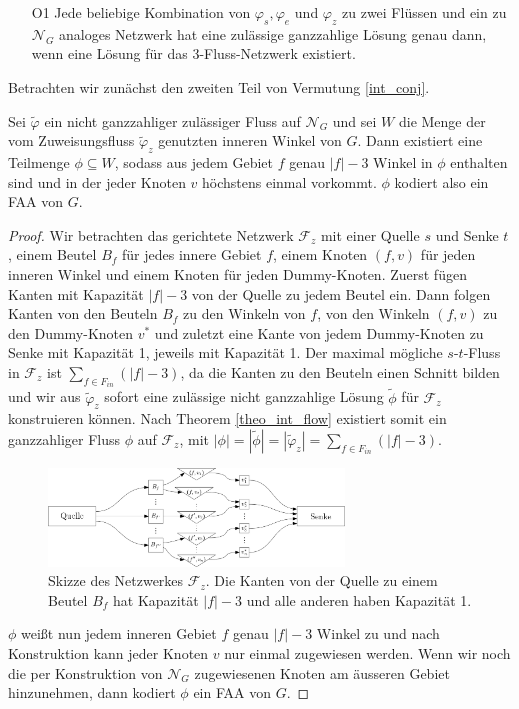 \begin{itemize}
\item [O1] Jede beliebige Kombination von $\varphi_s,\varphi_e$ und $\varphi_z$ zu zwei Flüssen und ein zu $\mathcal{N}_G$ analoges Netzwerk hat eine zulässige ganzzahlige Lösung genau dann, wenn eine Lösung für das 3-Fluss-Netzwerk existiert.
\end{itemize}

Betrachten wir zunächst den zweiten Teil von Vermutung \ref{int_conj}.

\begin{lemma}\label{lem_faa}
Sei $\tilde{\varphi}$ ein nicht ganzzahliger zulässiger Fluss auf $\mathcal{N}_G$ und sei $W$ die Menge der vom Zuweisungsfluss $\tilde{\varphi}_z$ genutzten inneren Winkel von $G$. Dann existiert eine Teilmenge $\phi\subseteq W$, sodass aus jedem Gebiet $f$ genau $|f|-3$ Winkel in $\phi$ enthalten sind und in der jeder Knoten $v$ höchstens einmal vorkommt. $\phi$ kodiert also ein FAA von $G$.
\end{lemma}

\begin{proof}
Wir betrachten das gerichtete Netzwerk $\mathcal{F}_z$ mit einer Quelle $s$ und Senke $t$, einem Beutel $B_f$ für jedes innere Gebiet $f$, einem Knoten $(f,v)$ für jeden inneren Winkel und einem Knoten für jeden Dummy-Knoten. Zuerst fügen Kanten mit Kapazität $|f|-3$ von der Quelle zu jedem Beutel ein. Dann folgen Kanten von den Beuteln $B_f$ zu den Winkeln von $f$, von den Winkeln $(f,v)$ zu den Dummy-Knoten $v^*$ und zuletzt eine Kante von jedem Dummy-Knoten zu Senke mit Kapazität 1, jeweils mit Kapazität 1. Der maximal mögliche $s$-$t$-Fluss in $\mathcal{F}_z$ ist $\sum_{f \in F_{in}}(|f|-3)$, da die Kanten zu den Beuteln einen Schnitt bilden und wir  aus $\tilde{\varphi}_z$ sofort eine zulässige nicht ganzzahlige Lösung $\tilde{\phi}$ für $\mathcal{F}_z$ konstruieren können. Nach Theorem \ref{theo_int_flow} existiert somit ein ganzzahliger Fluss $\phi$ auf $\mathcal{F}_z$, mit $|\phi| = |\tilde{\phi}| = |\tilde{\varphi}_z| = \sum_{f \in F_{in}}(|f|-3).$

\begin{figure}[h]
	\centering
  	\includegraphics[width=0.7\textwidth]{lem_faa_choice.png}
  	\caption{Skizze des Netzwerkes $\mathcal{F}_z$. Die Kanten von der Quelle zu einem Beutel $B_f$ hat Kapazität $|f|-3$ und alle anderen haben Kapazität 1.}
\end{figure}

$\phi$ weißt nun jedem inneren Gebiet $f$ genau $|f|-3$ Winkel zu und nach Konstruktion kann jeder Knoten $v$ nur einmal zugewiesen werden. Wenn wir noch die per Konstruktion von $\mathcal{N}_G$ zugewiesenen Knoten am äusseren Gebiet hinzunehmen, dann kodiert $\phi$ ein FAA von $G$.
\end{proof}

